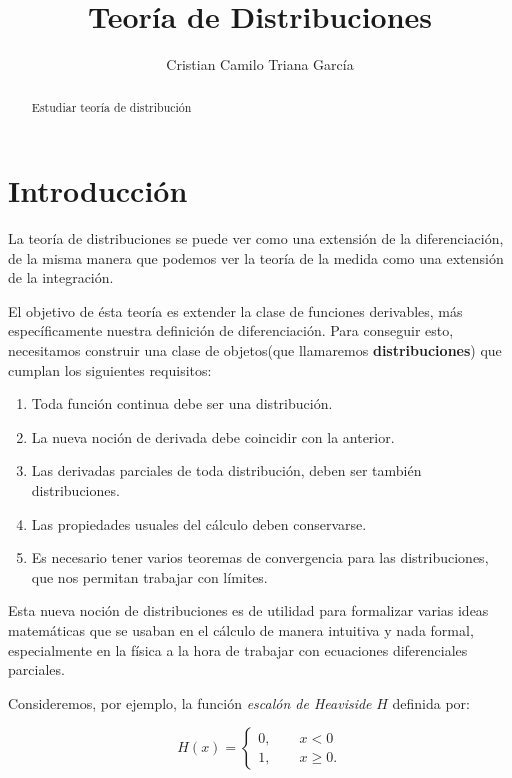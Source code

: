 \documentclass[letter,12pt]{article}
\title{Teoría de Distribuciones}
\author{Cristian Camilo Triana García}
\begin{document}
\maketitle

\begin{abstract}\normalsize
Estudiar teoría de distribución
\end{abstract}




\section{Introducción}
La teoría de distribuciones se puede ver como una extensión de la diferenciación,
de la misma manera que podemos ver la teoría de la medida como una extensión de la
integración.

El objetivo de ésta teoría es extender la clase de funciones derivables, más específicamente
nuestra definición de diferenciación. Para conseguir esto, necesitamos construir
una clase de objetos(que llamaremos \textbf{distribuciones}) que cumplan los siguientes requisitos:

\begin{enumerate}
	\item Toda función continua debe ser una distribución.
	\item La nueva noción de derivada debe coincidir con la anterior.
	\item Las derivadas parciales de toda distribución, deben ser también distribuciones.
	\item Las propiedades usuales del cálculo deben conservarse.
	\item Es necesario tener varios teoremas de convergencia para las distribuciones,
		que nos permitan trabajar con límites.
\end{enumerate}

Esta nueva noción de distribuciones es de utilidad para formalizar varias ideas matemáticas que se usaban en el cálculo de manera intuitiva y nada formal, especialmente en la física a la hora de trabajar con ecuaciones diferenciales parciales. 

Consideremos, por ejemplo, la función \textit{escalón de Heaviside} $ H $ definida por:

\begin{equation}
	H(x) = 
	\begin{cases}
		0, \qquad x < 0 \\
		1, \qquad x \ge 0. 
	\end{cases}
\end{equation}
\end{document}

